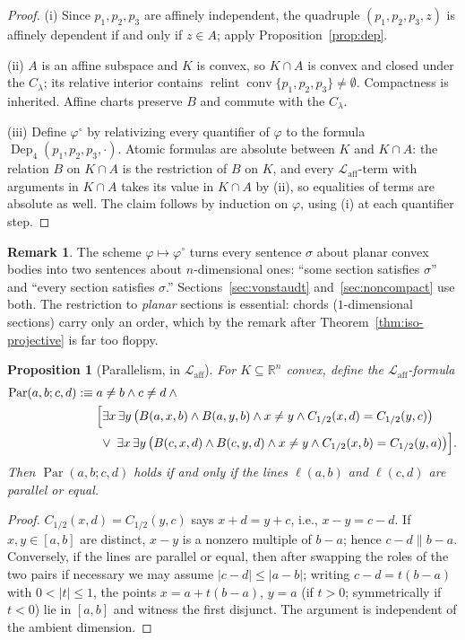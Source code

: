 \documentclass[11pt]{amsart}
\newtheorem{proposition}[theorem]{Proposition}
\theoremstyle{definition}
\newtheorem{remark}[theorem]{Remark}
\newcommand{\R}{\mathbb{R}}
\newcommand{\Laff}{\mathcal{L}_{\mathrm{aff}}}
\newcommand{\Par}{\operatorname{Par}}
\newcommand{\Dep}{\operatorname{Dep}}
\newcommand{\conv}{\operatorname{conv}}
\newcommand{\relint}{\operatorname{relint}}
\begin{document}
\begin{proof}
(i) Since $p_1,p_2,p_3$ are affinely independent, the quadruple
$(p_1,p_2,p_3,z)$ is affinely dependent if and only if $z\in A$; apply
Proposition~\ref{prop:dep}.

(ii) $A$ is an affine subspace and $K$ is convex, so $K\cap A$ is convex and
closed under the $C_\lambda$; its relative interior contains
$\relint\conv\{p_1,p_2,p_3\}\ne\emptyset$. Compactness is inherited. Affine
charts preserve $B$ and commute with the $C_\lambda$.

(iii) Define $\varphi^{\circ}$ by relativizing every quantifier of
$\varphi$ to the formula $\Dep_4(p_1,p_2,p_3,\cdot)$. Atomic formulas are
absolute between $K$ and $K\cap A$: the relation $B$ on $K\cap A$ is the
restriction of $B$ on $K$, and every $\Laff$-term with arguments in
$K\cap A$ takes its value in $K\cap A$ by (ii), so equalities of terms are
absolute as well. The claim follows by induction on $\varphi$, using (i) at
each quantifier step.
\end{proof}

\begin{remark}
The scheme $\varphi\mapsto\varphi^{\circ}$ turns every sentence $\sigma$
about planar convex bodies into two sentences about $n$-dimensional ones:
``some section satisfies $\sigma$'' and ``every section satisfies
$\sigma$.'' Sections~\ref{sec:vonstaudt} and~\ref{sec:noncompact} use both.
The restriction to \emph{planar} sections is essential: chords ($1$-dimensional
sections) carry only an order, which by the remark after
Theorem~\ref{thm:iso-projective} is far too floppy.
\end{remark}

\begin{proposition}[Parallelism, in $\Laff$]\label{prop:parallel}
For $K\subseteq\R^n$ convex, define the $\Laff$-formula
\begin{align*}
\Par(a,b;c,d):\equiv\;& a\ne b\wedge c\ne d\wedge{}\\
&\Bigl[\exists x\,\exists y\,\bigl(B(a,x,b)\wedge B(a,y,b)\wedge x\ne y
\wedge C_{1/2}(x,d)=C_{1/2}(y,c)\bigr)\\
&\;\vee\;
\exists x\,\exists y\,\bigl(B(c,x,d)\wedge B(c,y,d)\wedge x\ne y
\wedge C_{1/2}(x,b)=C_{1/2}(y,a)\bigr)\Bigr].
\end{align*}
Then $\Par(a,b;c,d)$ holds if and only if the lines $\ell(a,b)$ and
$\ell(c,d)$ are parallel or equal.
\end{proposition}

\begin{proof}
$C_{1/2}(x,d)=C_{1/2}(y,c)$ says $x+d=y+c$, i.e., $x-y=c-d$. If
$x,y\in[a,b]$ are distinct, $x-y$ is a nonzero multiple of $b-a$; hence
$c-d\parallel b-a$. Conversely, if the lines are parallel or equal, then
after swapping the roles of the two pairs if necessary we may assume
$|c-d|\le|a-b|$; writing $c-d=t(b-a)$ with $0<|t|\le 1$, the points
$x=a+t(b-a)$, $y=a$ (if $t>0$; symmetrically if $t<0$) lie in $[a,b]$ and
witness the first disjunct. The argument is independent of the ambient
dimension.
\end{proof}
\end{document}
